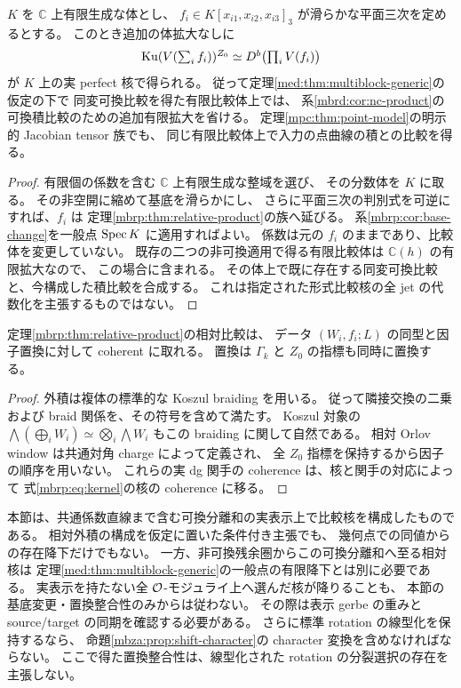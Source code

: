 \begin{corollary}[既存の比較体上での曲線積表示]
\label{mbrp:cor:comparison-field}
$K$ を $\mathbb C$ 上有限生成な体とし、
$f_i\in K[x_{i1},x_{i2},x_{i3}]_3$ が滑らかな平面三次を定めるとする。
このとき追加の体拡大なしに
\[
 \operatorname{Ku}(V(\textstyle\sum_i f_i))^{Z_0}
       \simeq D^b\bigl(\textstyle\prod_iV(f_i)\bigr)
\]
が $K$ 上の実 perfect 核で得られる。
従って定理\ref{med:thm:multiblock-generic}の仮定の下で
同変可換比較を得た有限比較体上では、
系\ref{mbrd:cor:nc-product}の可換積比較のための追加有限拡大を省ける。
定理\ref{mpc:thm:point-model}の明示的 Jacobian tensor 族でも、
同じ有限比較体上で入力の点曲線の積との比較を得る。
\end{corollary}
\begin{proof}
有限個の係数を含む $\mathbb C$ 上有限生成な整域を選び、
その分数体を $K$ に取る。
その非空開に縮めて基底を滑らかにし、
さらに平面三次の判別式を可逆にすれば、$f_i$ は
定理\ref{mbrp:thm:relative-product}の族へ延びる。
系\ref{mbrp:cor:base-change}を一般点 $\operatorname{Spec} K$ に適用すればよい。
係数は元の $f_i$ のままであり、比較体を変更していない。
既存の二つの非可換適用で得る有限比較体は $\mathbb C(h)$ の有限拡大なので、
この場合に含まれる。
その体上で既に存在する同変可換比較と、今構成した積比較を合成する。
これは指定された形式比較核の全 jet の代数化を主張するものではない。
\end{proof}

\begin{proposition}[因子置換との整合性]
\label{mbrp:prop:permutations}
定理\ref{mbrp:thm:relative-product}の相対比較は、
データ $(W_i,f_i;L)$ の同型と因子置換に対して coherent に取れる。
置換は $\Gamma_k$ と $Z_0$ の指標も同時に置換する。
\end{proposition}
\begin{proof}
外積は複体の標準的な Koszul braiding を用いる。
従って隣接交換の二乗および braid 関係を、その符号を含めて満たす。
Koszul 対象の
$\bigwedge(\bigoplus_iW_i)\simeq\bigotimes_i\bigwedge W_i$
もこの braiding に関して自然である。
相対 Orlov window は共通対角 charge によって定義され、
全 $Z_0$ 指標を保持するから因子の順序を用いない。
これらの実 dg 関手の coherence は、核と関手の対応によって
式\eqref{mbrp:eq:kernel}の核の coherence に移る。
\end{proof}

\begin{remark}[相対可換比較と未解決の降下]
\label{mbrp:rem:scope}
本節は、共通係数直線まで含む可換分離和の実表示上で比較核を構成したものである。
相対外積の構成を仮定に置いた条件付き主張でも、
幾何点での同値からの存在降下だけでもない。
一方、非可換残余圏からこの可換分離和へ至る相対核は
定理\ref{med:thm:multiblock-generic}の一般点の有限降下とは別に必要である。
実表示を持たない全 $\mathcal O$-モジュライ上へ選んだ核が降りることも、
本節の基底変更・置換整合性のみからは従わない。
その際は表示 gerbe の重みと source/target の同期を確認する必要がある。
さらに標準 rotation の線型化を保持するなら、
命題\ref{mbza:prop:shift-character}の character 変換を含めなければならない。
ここで得た置換整合性は、線型化された rotation の分裂選択の存在を主張しない。
\end{remark}
